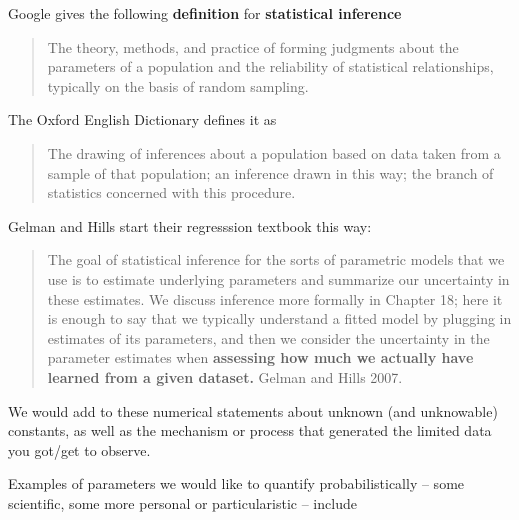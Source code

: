 \documentclass[]{book}
\begin{document}
Google gives the following \textbf{definition} for \textbf{statistical inference}

\begin{quote}
The theory, methods, and practice of forming judgments about the parameters of a population and the reliability of statistical relationships, typically on the basis of random sampling.
\end{quote}

The Oxford English Dictionary defines it as

\begin{quote}
The drawing of inferences about a population based on data taken from a sample of that population; an inference drawn in this way; the branch of statistics concerned with this procedure.
\end{quote}

Gelman and Hills start their regresssion textbook this way:

\begin{quote}
The goal of statistical inference for the sorts of parametric models that we use is to estimate underlying parameters and summarize our uncertainty in these estimates. We discuss inference more formally in Chapter 18; here it is enough to say that we typically understand a fitted model by plugging in estimates of its parameters, and then we consider the uncertainty in the parameter estimates when \textbf{assessing how much we actually have learned from a given dataset.} Gelman and Hills 2007.
\end{quote}

We would add to these numerical statements about unknown (and unknowable) constants, as well as the mechanism or process that generated the limited data you got/get to observe.

Examples of parameters we would like to quantify probabilistically -- some scientific, some more personal or particularistic -- include
\end{document}
